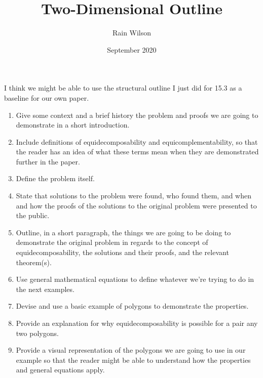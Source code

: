 \documentclass{article}
\title{Two-Dimensional Outline}
\author{Rain Wilson}
\date{September 2020}
\begin{document}
\maketitle

\paragraph{} I think we might be able to use the structural outline I just did for 15.3 as a baseline for our own paper.

\begin{enumerate}

    \item Give some context and a brief history the problem and proofs we are going to demonstrate in a short introduction.
    
    \item Include definitions of equidecomposability and equicomplementability, so that the reader has an idea of what these terms mean when they are demonstrated further in the paper.
    
    \item Define the problem itself.
    
    \item State that solutions to the problem were found, who found them, and when and how the proofs of the solutions to the original problem were presented to the public.
    
    \item Outline, in a short paragraph, the things we are going to be doing to demonstrate the original problem in regards to the concept of equidecomposability, the solutions and their proofs, and the relevant theorem(s).
    
    \item Use general mathematical equations to define whatever we're trying to do in the next examples.
    
    \item Devise and use a basic example of polygons to demonstrate the properties.
    
    \item Provide an explanation for why equidecomposability is possible for a pair any two polygons.
    
    \item Provide a visual representation of the polygons we are going to use in our example so that the reader might be able to understand how the properties and general equations apply.
    

\end{enumerate}
\end{document}
